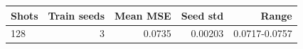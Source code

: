 \begin{tabular}{lrrrr}
\toprule
Shots & Train seeds & Mean MSE & Seed std & Range \\
\midrule
128 & 3 & 0.0735 & 0.00203 & 0.0717-0.0757 \\
\bottomrule
\end{tabular}

